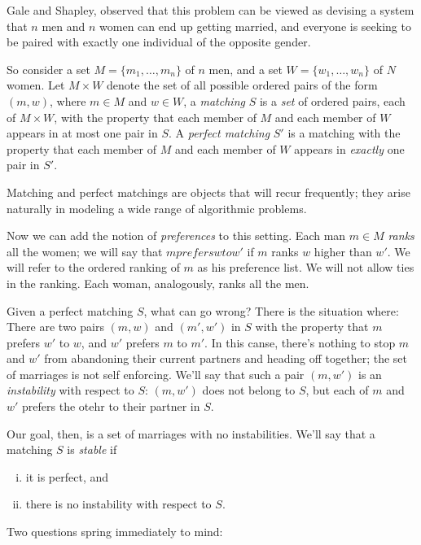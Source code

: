 \documentclass{article}
\begin{document}
Gale and Shapley, observed that this problem can be viewed as devising a
system that \(n\) men and \(n\) women can end up getting married, and
everyone is seeking to be paired with exactly one individual of the
opposite gender.

So consider a set \(M=\{m_1,\ldots,m_n\}\) of \(n\) men, and a set
\(W=\{w_1,\ldots,w_n\}\) of \(N\) women. Let \(M \times W\) denote the
set of all possible ordered pairs of the form \((m,w)\), where
\(m \in M\) and \(w \in W\), a \emph{matching} \(S\) is a \emph{set} of
ordered pairs, each of \(M \times W\), with the property that each
member of \(M\) and each member of \(W\) appears in at most one pair in
\(S\). A \emph{perfect matching} \(S'\) is a matching with the property
that each member of \(M\) and each member of \(W\) appears in
\emph{exactly} one pair in \(S'\).

Matching and perfect matchings are objects that will recur frequently;
they arise naturally in modeling a wide range of algorithmic problems.

Now we can add the notion of \emph{preferences} to this setting. Each
man \(m \in M\) \emph{ranks} all the women; we will say that
\(m prefers w to w'\) if \(m\) ranks \(w\) higher than \(w'\). We will
refer to the ordered ranking of \(m\) as his preference list. We will
not allow ties in the ranking. Each woman, analogously, ranks all the
men.

Given a perfect matching \(S\), what can go wrong? There is the
situation where: There are two pairs \((m,w)\) and \((m',w')\) in \(S\)
with the property that \(m\) prefers \(w'\) to \(w\), and \(w'\) prefers
\(m\) to \(m'\). In this canse, there's nothing to stop \(m\) and \(w'\)
from abandoning their current partners and heading off together; the set
of marriages is not self enforcing. We'll say that such a pair
\((m, w')\) is an \emph{instability} with respect to \(S\): \((m,w')\)
does not belong to \(S\), but each of \(m\) and \(w'\) prefers the otehr
to their partner in \(S\).

Our goal, then, is a set of marriages with no instabilities. We'll say
that a matching \(S\) is \emph{stable} if

\begin{enumerate}[(i)]
  \item it is perfect, and
  \item there is no instability with respect to \(S\).
\end{enumerate}

Two questions spring immediately to mind:
\end{document}
